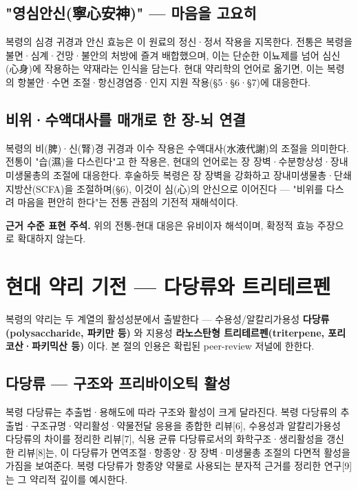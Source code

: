 \documentclass[11pt,oneside]{book}
\newenvironment{authnote}
  {\par\smallskip\begingroup\leftskip=7mm\rightskip=5mm\small\color{muted}\noindent\ignorespaces}
  {\par\endgroup\smallskip}
\begin{document}
\subsection{"영심안신(寧心安神)" — 마음을 고요히}
복령의 심경 귀경과 안신 효능은 이 원료의 정신·정서 작용을 지목한다. 전통은 복령을 불면·심계·건망·불안의 처방에 즐겨 배합했으며, 이는 단순한 이뇨제를 넘어 심신(心身)에 작용하는 약재라는 인식을 담는다. 현대 약리학의 언어로 옮기면, 이는 복령의 항불안·수면 조절·항신경염증·인지 지원 작용(§5·§6·§7)에 대응한다.

\subsection{비위·수액대사를 매개로 한 장-뇌 연결}
복령의 비(脾)·신(腎)경 귀경과 이수 작용은 수액대사(水液代謝)의 조절을 의미한다. 전통이 "습(濕)을 다스린다"고 한 작용은, 현대의 언어로는 장 장벽·수분항상성·장내미생물총의 조절에 대응한다. 후술하듯 복령은 장 장벽을 강화하고 장내미생물총·단쇄지방산(SCFA)을 조절하며(§6), 이것이 심(心)의 안신으로 이어진다 — "비위를 다스려 마음을 편안히 한다"는 전통 관점의 기전적 재해석이다.

\begin{authnote}\textbf{근거 수준 표현 주석.} 위의 전통-현대 대응은 유비이자 해석이며, 확정적 효능 주장으로 확대하지 않는다.\end{authnote}
\section{현대 약리 기전 — 다당류와 트리테르펜}
복령의 약리는 두 계열의 활성성분에서 출발한다 — 수용성/알칼리가용성 \textbf{다당류(polysaccharide, 파키만 등)} 와 지용성 \textbf{라노스탄형 트리테르펜(triterpene, 포리코산·파키믹산 등)} 이다. 본 절의 인용은 확립된 peer-review 저널에 한한다.

\subsection{다당류 — 구조와 프리바이오틱 활성}
복령 다당류는 추출법·용해도에 따라 구조와 활성이 크게 달라진다. 복령 다당류의 추출법·구조규명·약리활성·약물전달 응용을 종합한 리뷰[6], 수용성과 알칼리가용성 다당류의 차이를 정리한 리뷰[7], 식용 균류 다당류로서의 화학구조·생리활성을 갱신한 리뷰[8]는, 이 다당류가 면역조절·항종양·장 장벽·미생물총 조절의 다면적 활성을 가짐을 보여준다. 복령 다당류가 항종양 약물로 사용되는 분자적 근거를 정리한 연구[9]는 그 약리적 깊이를 예시한다.
\end{document}
